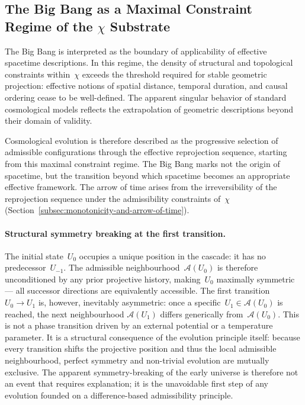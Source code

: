 \subsection{The Big Bang as a Maximal Constraint Regime of the \texorpdfstring{$\chi$}{χ} Substrate}
  \label{subsec:big-bang-maximal-constraint}

  The Big Bang is interpreted as the boundary of applicability of effective
  spacetime descriptions.
  In this regime, the density of structural and topological constraints
  within~$\chi$ exceeds the threshold required for stable geometric
  projection: effective notions of spatial distance, temporal duration, and
  causal ordering cease to be well-defined.
  The apparent singular behavior of standard cosmological models reflects
  the extrapolation of geometric descriptions beyond their domain of validity.

  Cosmological evolution is therefore described as the progressive selection
  of admissible configurations through the effective reprojection sequence,
  starting from this maximal constraint regime.
  The Big Bang marks not the origin of spacetime, but the transition beyond
  which spacetime becomes an appropriate effective framework.
  The arrow of time arises from the irreversibility of the reprojection
  sequence under the admissibility constraints of~$\chi$
  (Section~\ref{subsec:monotonicity-and-arrow-of-time}).

  \paragraph{Structural symmetry breaking at the first transition.}
    The initial state~$U_0$ occupies a unique position in the cascade: it has no
    predecessor~$U_{-1}$.
    The admissible neighbourhood~$\mathcal{A}(U_0)$ is therefore unconditioned by
    any prior projective history, making~$U_0$ maximally symmetric --- all
    successor directions are equivalently accessible.
    The first transition $U_0 \to U_1$ is, however, inevitably asymmetric: once
    a specific~$U_1 \in \mathcal{A}(U_0)$ is reached, the next neighbourhood
    $\mathcal{A}(U_1)$ differs generically from~$\mathcal{A}(U_0)$.
    This is not a phase transition driven by an external potential or a
    temperature parameter.
    It is a structural consequence of the evolution principle itself:
    because every transition shifts the projective position and thus the
    local admissible neighbourhood, perfect symmetry and non-trivial evolution
    are mutually exclusive.
    The apparent symmetry-breaking of the early universe is therefore not
    an event that requires explanation; it is the unavoidable first step
    of any evolution founded on a difference-based admissibility principle.
